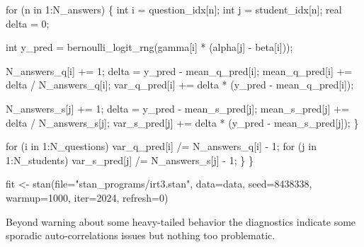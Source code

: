\documentclass[
  letterpaper,
  DIV=11,
  numbers=noendperiod]{scrartcl}
\newenvironment{Shaded}{\begin{snugshade}}{\end{snugshade}}
\newcommand{\AttributeTok}[1]{\textcolor[rgb]{0.40,0.45,0.13}{#1}}
\newcommand{\ControlFlowTok}[1]{\textcolor[rgb]{0.00,0.23,0.31}{#1}}
\newcommand{\DataTypeTok}[1]{\textcolor[rgb]{0.68,0.00,0.00}{#1}}
\newcommand{\DecValTok}[1]{\textcolor[rgb]{0.68,0.00,0.00}{#1}}
\newcommand{\FunctionTok}[1]{\textcolor[rgb]{0.28,0.35,0.67}{#1}}
\newcommand{\NormalTok}[1]{\textcolor[rgb]{0.00,0.23,0.31}{#1}}
\newcommand{\OtherTok}[1]{\textcolor[rgb]{0.00,0.23,0.31}{#1}}
\newcommand{\StringTok}[1]{\textcolor[rgb]{0.13,0.47,0.30}{#1}}
\begin{document}
\begin{codelisting}
\begin{Shaded}
\begin{Highlighting}[]
    \ControlFlowTok{for}\NormalTok{ (n }\ControlFlowTok{in} \DecValTok{1}\NormalTok{:N\_answers) \{}
      \DataTypeTok{int}\NormalTok{ i = question\_idx[n];}
      \DataTypeTok{int}\NormalTok{ j = student\_idx[n];}
      \DataTypeTok{real}\NormalTok{ delta = }\DecValTok{0}\NormalTok{;}

      \DataTypeTok{int}\NormalTok{ y\_pred = bernoulli\_logit\_rng(gamma[i] * (alpha[j] {-} beta[i]));}

\NormalTok{      N\_answers\_q[i] += }\DecValTok{1}\NormalTok{;}
\NormalTok{      delta = y\_pred {-} mean\_q\_pred[i];}
\NormalTok{      mean\_q\_pred[i] += delta / N\_answers\_q[i];}
\NormalTok{      var\_q\_pred[i] += delta * (y\_pred {-} mean\_q\_pred[i]);}

\NormalTok{      N\_answers\_s[j] += }\DecValTok{1}\NormalTok{;}
\NormalTok{      delta = y\_pred {-} mean\_s\_pred[j];}
\NormalTok{      mean\_s\_pred[j] += delta / N\_answers\_s[j];}
\NormalTok{      var\_s\_pred[j] += delta * (y\_pred {-} mean\_s\_pred[j]);}
\NormalTok{    \}}

    \ControlFlowTok{for}\NormalTok{ (i }\ControlFlowTok{in} \DecValTok{1}\NormalTok{:N\_questions)}
\NormalTok{      var\_q\_pred[i] /= N\_answers\_q[i] {-} }\DecValTok{1}\NormalTok{;}
    \ControlFlowTok{for}\NormalTok{ (j }\ControlFlowTok{in} \DecValTok{1}\NormalTok{:N\_students)}
\NormalTok{      var\_s\_pred[j] /= N\_answers\_s[j] {-} }\DecValTok{1}\NormalTok{;}
\NormalTok{  \}}
\NormalTok{\}}
\end{Highlighting}
\end{Shaded}

\end{codelisting}

\begin{Shaded}
\begin{Highlighting}[]
\NormalTok{fit }\OtherTok{\textless{}{-}} \FunctionTok{stan}\NormalTok{(}\AttributeTok{file=}\StringTok{"stan\_programs/irt3.stan"}\NormalTok{,}
            \AttributeTok{data=}\NormalTok{data, }\AttributeTok{seed=}\DecValTok{8438338}\NormalTok{,}
            \AttributeTok{warmup=}\DecValTok{1000}\NormalTok{, }\AttributeTok{iter=}\DecValTok{2024}\NormalTok{, }\AttributeTok{refresh=}\DecValTok{0}\NormalTok{)}
\end{Highlighting}
\end{Shaded}

Beyond warning about some heavy-tailed behavior the diagnostics indicate
some sporadic auto-correlations issues but nothing too problematic.
\end{document}
